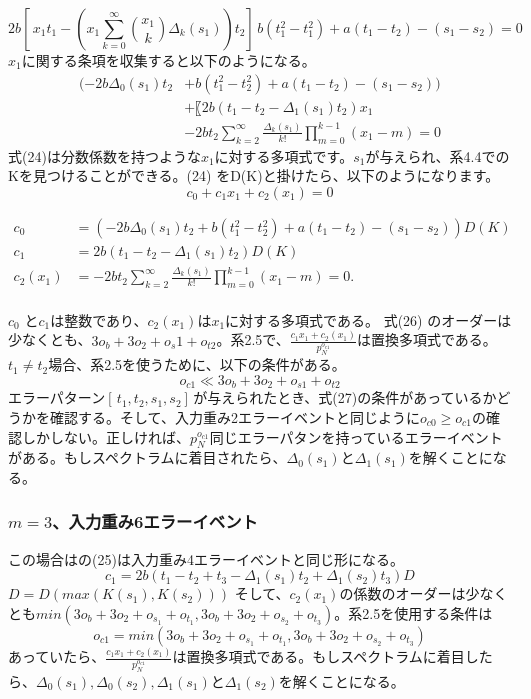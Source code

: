 \documentclass[20 pts]{article}
\begin{document}
\begin{equation}\tag{23}
2b[\,x_1t_1-(x_1\sum_{k=0}^\infty {x_1 \choose k}\Delta_k(s_1))t_2]\, b(t_1^2-t_1^2)+a(t_1-t_2)-(s_1-s_2)=0
\end{equation}
$x_1$に関する条項を収集すると以下のようになる。
\begin{equation}\tag{24}
\begin{split}
(-2b\Delta_0 (s_1 ) t_2&+b(t_1^2-t_2^2)+a(t_1-t_2)-(s_1-s_2))\\
&+〖2b(t_1-t_2-\Delta_1 (s_1 ) t_2)x_1\\
&-2bt_2 \sum_{k=2}^\infty \frac{\Delta_k (s_1 )}{k!} \prod_{m=0}^{k-1}(x_1 -m)=0
\end{split}   
\end{equation}
式(24)は分数係数を持つような$x_1$に対する多項式です。$s_1$が与えられ、系4.4でのKを見つけることができる。(24) をD(K)と掛けたら、以下のようになります。
\begin{equation}\tag{25}
c_0+c_1 x_1+c_2 (x_1 )=0
\end{equation}

\begin{align*}
c_0&=(-2b\Delta_0 (s_1 ) t_2+b(t_1^2-t_2^2)+a(t_1-t_2)-(s_1-s_2))D(K)\\
c_1&=2b(t_1-t_2-\Delta_1 (s_1 ) t_2)D(K)\\
c_2 (x_1 )&=-2bt_2 \sum_{k=2}^\infty \frac{\Delta_k (s_1 )}{k!} \prod_{m=0}^{k-1}(x_1 -m)=0.\tag{26}
\end{align*}
\paragraph{}
$c_0$ と$c_1$は整数であり、$c_2 (x_1 )$は$x_1$に対する多項式である。
式(26) のオーダーは少なくとも、$3o_b+3o_2+o_s1+o_{t2}$。系2.5で、$\frac{c_1 x_1+c_2 (x_1 )}{p_N^{o_{c1} }}$は置換多項式である。$t_1\neq t_2$場合、系2.5を使うために、以下の条件がある。
\begin{equation}　\tag{27}
o_{c1}\ll3o_b+3o_2+o_{s1}+o_{t2}\end{equation}							
エラーパターン$[\,t_1 , t_2  , s_1 ,  s_2]\,$が与えられたとき、式(27)の条件があっているかどうかを確認する。そして、入力重み2エラーイベントと同じように$o_{c0}  \geq o_{c1}$の確認しかしない。正しければ、$p_N^{o_{c1}}$同じエラーパタンを持っているエラーイベントがある。もしスペクトラムに着目されたら、$\Delta_0 (s_1 )$と$\Delta_1 (s_1 )$を解くことになる。

\subsubsection{$m=3$、入力重み6エラーイベント}
この場合はの(25)は入力重み4エラーイベントと同じ形になる。
$$c_1=2b(t_1-t_2+t_3-\Delta_1(s_1)t_2+\Delta_1(s_2)t_3)D$$
$D=D(max(K(s_1),K(s_2)))$
そして、$c_2(x_1)$の係数のオーダーは少なくとも$min(3o_b+3o_2+o_{s_1}+o_{t_1},3o_b+3o_2+o_{s_2}+o_{t_3})$。系2.5を使用する条件は
\begin{equation}\tag{28}
o_{c1}=min(3o_b+3o_2+o_{s_1}+o_{t_1},3o_b+3o_2+o_{s_2}+o_{t_3})
\end{equation}
あっていたら、$\frac{c_1 x_1+c_2 (x_1 )}{p_N^{o_{c1}} }$は置換多項式である。もしスペクトラムに着目したら、$\Delta_0 (s_1 ), \Delta_0 (s_2 ), \Delta_1 (s_1 )$と$\Delta_1 (s_2 )$を解くことになる。
\end{document}
